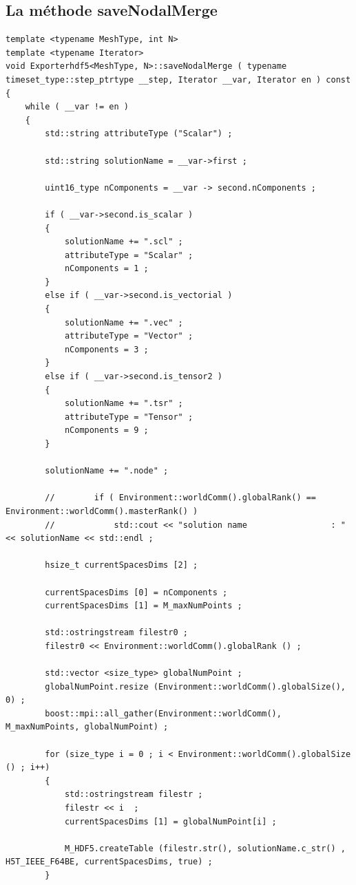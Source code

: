 \documentclass[12pt]{article}
\begin{document}
\subsection {La méthode saveNodalMerge}
\begin{lstlisting}
template <typename MeshType, int N>
template <typename Iterator>
void Exporterhdf5<MeshType, N>::saveNodalMerge ( typename timeset_type::step_ptrtype __step, Iterator __var, Iterator en ) const 
{   
    while ( __var != en )
    {    
        std::string attributeType ("Scalar") ;

        std::string solutionName = __var->first ;

        uint16_type nComponents = __var -> second.nComponents ;

        if ( __var->second.is_scalar )
        {
            solutionName += ".scl" ; 
            attributeType = "Scalar" ;
            nComponents = 1 ;
        }
        else if ( __var->second.is_vectorial )
        {
            solutionName += ".vec" ;
            attributeType = "Vector" ;
            nComponents = 3 ;
        }
        else if ( __var->second.is_tensor2 )
        {
            solutionName += ".tsr" ;
            attributeType = "Tensor" ;
            nComponents = 9 ;
        }

        solutionName += ".node" ;

        //        if ( Environment::worldComm().globalRank() == Environment::worldComm().masterRank() )
        //            std::cout << "solution name                 : " << solutionName << std::endl ;

        hsize_t currentSpacesDims [2] ;

        currentSpacesDims [0] = nComponents ;
        currentSpacesDims [1] = M_maxNumPoints ;

        std::ostringstream filestr0 ;
        filestr0 << Environment::worldComm().globalRank () ;

        std::vector <size_type> globalNumPoint ;
        globalNumPoint.resize (Environment::worldComm().globalSize(), 0) ;
        boost::mpi::all_gather(Environment::worldComm(), M_maxNumPoints, globalNumPoint) ;

        for (size_type i = 0 ; i < Environment::worldComm().globalSize () ; i++)
        {
            std::ostringstream filestr ;
            filestr << i  ;
            currentSpacesDims [1] = globalNumPoint[i] ;

            M_HDF5.createTable (filestr.str(), solutionName.c_str() , H5T_IEEE_F64BE, currentSpacesDims, true) ;
        }


\end{lstlisting}
\end{document}
